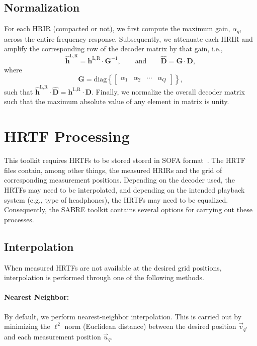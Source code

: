 \documentclass[11pt, oneside]{article}
\begin{document}
\subsection{Normalization}
For each HRIR (compacted or not), we first compute the maximum gain, $\alpha_q$, across the entire frequency response.
Subsequently, we attenuate each HRIR and amplify the corresponding row of the decoder matrix by that gain, i.e.,
\begin{equation}
\mathbf{\hat{h}}^{\text{L,R}} = \mathbf{h}^{\text{L,R}} \cdot \mathbf{G}^{-1},
\quad\quad
\text{and}
\quad\quad
\mathbf{\hat{D}} = \mathbf{G} \cdot \mathbf{D},
\end{equation}
where
\begin{equation}
\mathbf{G} = \text{diag} \left\{ \begin{bmatrix} \alpha_1 & \alpha_2 & \cdots & \alpha_Q \end{bmatrix} \right\},
\end{equation}
such that $\mathbf{\hat{h}}^{\text{L,R}} \cdot \mathbf{\hat{D}} = \mathbf{h}^{\text{L,R}} \cdot \mathbf{D}$.
Finally, we normalize the overall decoder matrix such that the maximum absolute value of any element in matrix is unity.

\section{HRTF Processing}\label{sec:HRTFs}
This toolkit requires HRTFs to be stored stored in SOFA format~\citep{AES69-2015}.
The HRTF files contain, among other things, the measured HRIRs and the grid of corresponding measurement positions.
Depending on the decoder used, the HRTFs may need to be interpolated,
and depending on the intended playback system (e.g., type of headphones), the HRTFs may need to be equalized.
Consequently, the SABRE toolkit contains several options for carrying out these processes.

\subsection{Interpolation}
When measured HRTFs are not available at the desired grid positions, interpolation is performed through one of the following methods.

\paragraph{Nearest Neighbor:} By default, we perform nearest-neighbor interpolation.
This is carried out by minimizing the $\ell^2$ norm (Euclidean distance) between the desired position
$\vec{v}_{q'}$ and each measurement position $\vec{u}_q$.
\end{document}
